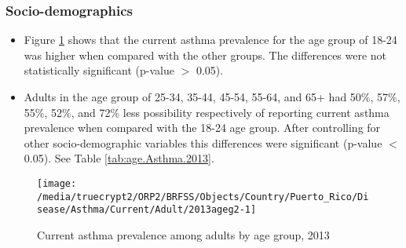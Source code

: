 
\newpage
\subsubsection{Socio-demographics}

\begin{itemize}

\item Figure \ref{fig:age.Asthma.2013} shows that the current asthma prevalence for the age group of
18-24
was higher when compared with the other groups. The differences were not statistically significant (p-value $>$ 0.05).

\item Adults in the age group of 25-34, 35-44, 45-54, 55-64, and 65+ had 50\%, 57\%, 55\%, 52\%, and 72\% less possibility respectively of reporting current asthma prevalence when compared with the 18-24 age group. After controlling for other socio-demographic variables this differences were significant (p-value $<$ 0.05). See Table \ref{tab:age.Asthma.2013}.


\end{itemize}


\begin{figure}[H]
\caption{Current asthma prevalence among adults by age group, 
2013}
\begin{knitrout}
\color{fgcolor}

{\centering \texttt{[image: /media/truecrypt2/ORP2/BRFSS/Objects/Country/Puerto\_Rico/Disease/Asthma/Current/Adult/2013ageg2-1]} 

}



\end{knitrout}
\label{fig:age.Asthma.2013}
\end{figure}

